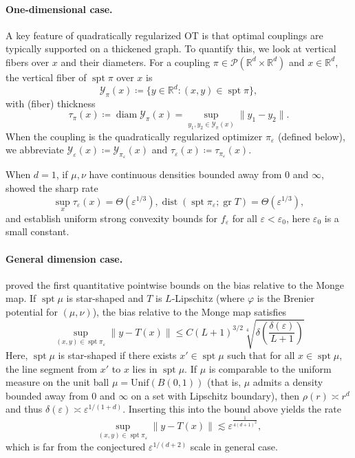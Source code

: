 \documentclass{article}
\theoremstyle{plain}
\theoremstyle{definition}
\theoremstyle{remark}
\numberwithin{equation}{section}
\DeclareMathOperator{\spt}{spt}
\DeclareMathOperator{\gr}{gr}
\DeclareMathOperator{\dist}{dist}
\DeclareMathOperator{\diam}{diam}
\newcommand{\R}{\mathbb{R}}
\begin{document}
\paragraph{One-dimensional case.}
A key feature of quadratically regularized OT is that optimal couplings are typically supported on a thickened graph. 
To quantify this, we look at vertical fibers over $x$ and their diameters.
For a coupling $\pi\in\mathcal P(\R^d\times\R^d)$ and $x\in\R^d$, the vertical fiber of $\spt\pi$ over $x$ is
$$
\mathcal Y_\pi(x)\coloneqq\{y\in\R^d:(x,y)\in\spt\pi\},
$$
with (fiber) thickness
$$
\tau_\pi(x)\coloneqq\diam\mathcal Y_\pi(x)=\sup_{y_1,y_2\in\mathcal Y_\pi(x)}\|y_1-y_2\|.
$$
When the coupling is the quadratically regularized optimizer $\pi_\varepsilon$ (defined below), we abbreviate $\mathcal Y_\varepsilon(x)\coloneqq\mathcal Y_{\pi_\varepsilon}(x)$ and $\tau_\varepsilon(x)\coloneqq\tau_{\pi_\varepsilon}(x)$.

When $d=1$, if $\mu,\nu$ have continuous densities bounded away from $0$ and $\infty$, \citet{gonzalez2024sparsity} showed the sharp rate
$$
\sup_x\tau_\varepsilon(x)=\Theta(\varepsilon^{1/3}),\dist(\spt\pi_\varepsilon;\gr T)=\Theta(\varepsilon^{1/3}),
$$
and establish uniform strong convexity bounds for $f_\varepsilon$ for all $\varepsilon<\varepsilon_0$, here $\varepsilon_0$ is a small constant.
\paragraph{General dimension case.}
\citet{wiesel2025sparsity} proved the first quantitative pointwise bounds on the bias relative to the Monge map.
If $\spt\mu$ is star-shaped and $T$ is $L$-Lipschitz (where $\varphi$ is the Brenier potential for $(\mu,\nu)$), the bias relative to the Monge map satisfies
$$
\sup_{(x,y)\in\spt\pi_\varepsilon}\|y-T(x)\|\le C(L+1)^{3/2}\sqrt[4]{\delta\left(\frac{\delta(\varepsilon)}{L+1}\right)}
$$
Here, $\spt\mu$ is star-shaped if there exists $x'\in\spt\mu$ such that for all $x\in\spt\mu$, the line segment from $x'$ to $x$ lies in $\spt\mu$.
If $\mu$ is comparable to the uniform measure on the unit ball $\mu=\mathrm{Unif}(B(0,1))$ (that is, $\mu$ admits a density bounded away from $0$ and $\infty$ on a set with Lipschitz boundary), then $\rho(r)\asymp r^d$ and thus $\delta(\varepsilon)\asymp\varepsilon^{1/(1+d)}$.
Inserting this into the bound above yields the rate
$$
\sup_{(x,y)\in\spt\pi_\varepsilon}\|y-T(x)\|\lesssim\varepsilon^{\frac{1}{4(d+1)^2}},
$$
which is far from the conjectured $\varepsilon^{1/(d+2)}$ scale in general case.
\end{document}
